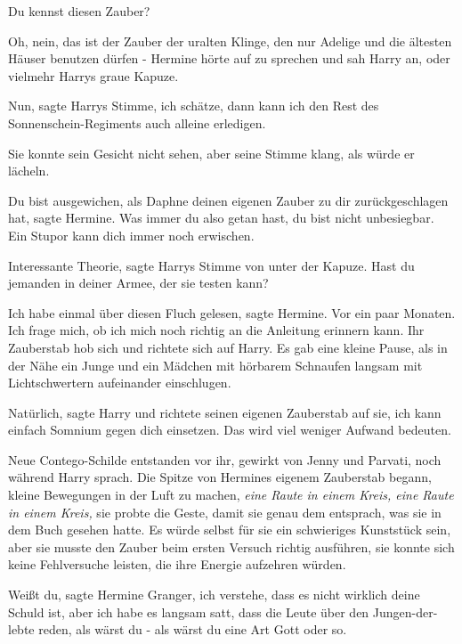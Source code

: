 \glqq{}Du kennst diesen Zauber?\grqq{}

\glqq{}Oh, nein, das ist der Zauber der uralten Klinge, den nur Adelige und die
ältesten Häuser benutzen dürfen -\grqq{} Hermine hörte auf zu sprechen und sah
Harry an, oder vielmehr Harrys graue Kapuze.

\glqq{}Nun\grqq{}, sagte Harrys Stimme, \glqq{}ich schätze, dann kann ich den Rest
des Sonnenschein-Regiments auch alleine erledigen.\grqq{}

Sie konnte sein Gesicht nicht sehen, aber seine Stimme klang, als würde er
lächeln.

\glqq{}Du bist ausgewichen, als Daphne deinen eigenen Zauber zu dir
zurückgeschlagen hat\grqq{}, sagte Hermine. \glqq{}Was immer du also getan hast,
du bist nicht unbesiegbar. Ein Stupor kann dich immer noch erwischen.\grqq{}

\glqq{}Interessante Theorie\grqq{}, sagte Harrys Stimme von unter der Kapuze.
\glqq{}Hast du jemanden in deiner Armee, der sie testen kann?\grqq{}

\glqq{}Ich habe einmal über diesen Fluch gelesen\grqq{}, sagte Hermine. \glqq{}Vor
ein paar Monaten. Ich frage mich, ob ich mich noch richtig an die Anleitung
erinnern kann.\grqq{} Ihr Zauberstab hob sich und richtete sich auf Harry. Es
gab eine kleine Pause, als in der Nähe ein Junge und ein Mädchen mit hörbarem
Schnaufen langsam mit Lichtschwertern aufeinander einschlugen.

\glqq{}Natürlich\grqq{}, sagte Harry und richtete seinen eigenen Zauberstab auf
sie, \glqq{}ich kann einfach Somnium gegen dich einsetzen. Das wird viel weniger
Aufwand bedeuten.\grqq{}

Neue Contego-Schilde entstanden vor ihr, gewirkt von Jenny und Parvati, noch
während Harry sprach. Die Spitze von Hermines eigenem Zauberstab begann, kleine
Bewegungen in der Luft zu machen, \emph{eine Raute in einem Kreis, eine Raute in
einem Kreis,} sie probte die Geste, damit sie genau dem entsprach, was sie in
dem Buch gesehen hatte. Es würde selbst für sie ein schwieriges Kunststück sein,
aber sie musste den Zauber beim ersten Versuch richtig ausführen, sie konnte
sich keine Fehlversuche leisten, die ihre Energie aufzehren würden.

\glqq{}Weißt du\grqq{}, sagte Hermine Granger, \glqq{}ich verstehe, dass es nicht
wirklich deine Schuld ist, aber ich habe es langsam satt, dass die Leute über
den Jungen-der-lebte reden, als wärst du - als wärst du eine Art Gott oder
so.\grqq{}

